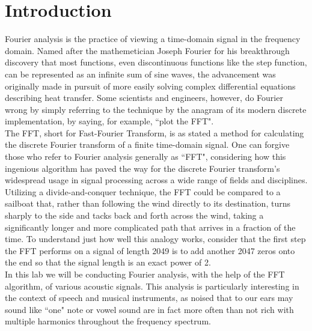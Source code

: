 \documentclass[aps,prl,reprint]{revtex4-2}
\begin{document}
\maketitle

\section{Introduction}
Fourier analysis is the practice of viewing a time-domain signal in the
frequency domain. Named after the mathemetician Joseph Fourier for his 
breakthrough discovery that most functions, even discontinuous functions
like the step function, can be represented as an infinite sum of sine 
waves, the advancement was originally made in pursuit of more easily
solving complex differential equations describing heat transfer. Some 
scientists and engineers, however, do Fourier wrong by simply
referring to the technique by the anagram of its modern discrete 
implementation, by saying, for example, ``plot the FFT". \\

The FFT, short for Fast-Fourier Transform, is as stated a method for
calculating the discrete Fourier transform of a finite time-domain signal.
One can forgive those who refer to Fourier analysis generally as ``FFT", 
considering how this ingenious algorithm has paved the way for
the discrete Fourier transform's widespread usage in signal processing
across a wide range of fields and disciplines. \\

Utilizing a divide-and-conquer technique, the FFT could be compared to 
a sailboat that, rather than following the wind directly to its destination,
turns sharply to the side and tacks back and forth across the wind,
taking a significantly longer and more complicated path that arrives in 
a fraction of the time. To understand just how well this analogy works,
consider that the first step the FFT performs on a signal of length 2049
is to add another 2047 zeros onto the end so that the signal length is 
an exact power of 2. \\

In this lab we will be conducting Fourier analysis, with the help of the 
FFT algorithm, of various acoustic signals. This analysis is particularly
interesting in the context of speech and musical instruments, as noised that
to our ears may sound like ``one" note or vowel sound are in fact more
often than not rich with multiple harmonics throughout the frequency spectrum.\\
\end{document}
